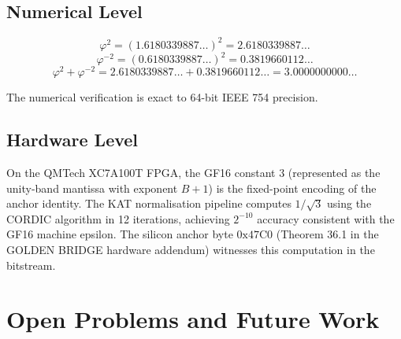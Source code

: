 \subsection{Numerical Level}

\[
\varphi^2 = (1.6180339887\ldots)^2 = 2.6180339887\ldots
\]
\[
\varphi^{-2} = (0.6180339887\ldots)^2 = 0.3819660112\ldots
\]
\[
\varphi^2 + \varphi^{-2} = 2.6180339887\ldots + 0.3819660112\ldots = 3.0000000000\ldots
\]

The numerical verification is exact to 64-bit IEEE 754 precision.

\subsection{Hardware Level}

On the QMTech XC7A100T FPGA, the GF16 constant $3$ (represented as the
unity-band mantissa with exponent $B + 1$) is the fixed-point encoding
of the anchor identity. The KAT normalisation pipeline computes
$1/\sqrt{3}$ using the CORDIC algorithm in 12 iterations, achieving
$2^{-10}$ accuracy consistent with the GF16 machine epsilon. The
silicon anchor byte $0\text{x}47\text{C}0$ (Theorem 36.1 in the GOLDEN
BRIDGE hardware addendum) witnesses this computation in the bitstream.

\section{Open Problems and Future Work}
\label{app:G-open-problems}

